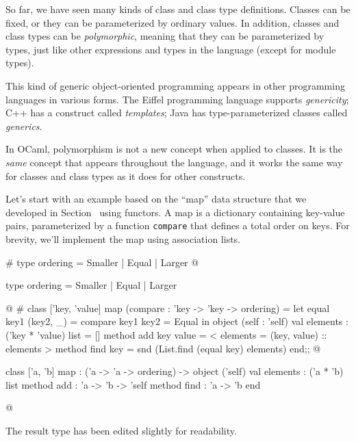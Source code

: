 %
%
%


So far, we have seen many kinds of class and class type definitions.  Classes can be fixed, or they
can be parameterized by ordinary values.  In addition, classes and class types can be
\emph{polymorphic}, meaning that they can be parameterized by types, just like other expressions and
types in the language (except for module types).

This kind of generic object-oriented programming appears in other
programming languages in various forms.  The Eiffel programming
language supports \emph{genericity}; C++ has a construct
called \emph{templates}; Java has type-parameterized classes
called \emph{generics}.

In OCaml, polymorphism is not a new concept when applied to classes.
It is the \emph{same} concept that appears throughout the language,
and it works the same way for classes and class types as it does for
other constructs.

\label{page:poly-map}
\label{classes:polymorphic}

Let's start with an example based on the ``map'' data structure that
we developed in Section~
using functors.  A map is a
dictionary containing key-value pairs, parameterized by a
function \hbox{\lstinline$compare$} that defines a total order on keys.  For
brevity, we'll implement the map using association lists.

\begin{ocaml}
# type ordering = Smaller | Equal | Larger
@
\begin{topoutput}
type ordering = Smaller | Equal | Larger
\end{topoutput}
@
# class ['key, 'value] map (compare : 'key -> 'key -> ordering) =
     let equal key1 (key2, _) = compare key1 key2 = Equal in
     object (self : 'self)
        val elements : ('key * 'value) list = []
        method add key value = {< elements = (key, value) :: elements >}
        method find key = snd (List.find (equal key) elements)
     end;;
@
\begin{topoutput}
class ['a, 'b] map : ('a -> 'a -> ordering) ->
  object ('self)
    val elements : ('a * 'b) list
    method add : 'a -> 'b -> 'self
    method find : 'a -> 'b
  end
\end{topoutput}
@
\end{ocaml}
%
The result type has been edited slightly for readability.

